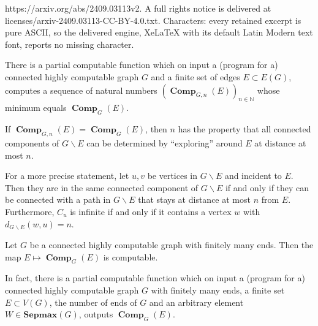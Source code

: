 \documentclass[10pt,a4paper]{amsart}
\newcommand{\N}{\mathbb{N}}
\newcommand{\comp}{\operatorname{\mathbf{Comp}}}
\newcommand{\sepmax}[1]{\mathbf{Sepmax}({#1})}
\begin{document}
https://arxiv.org/abs/2409.03113v2. A full rights notice is delivered at licenses/arxiv-2409.03113-CC-BY-4.0.txt. Characters: every retained excerpt is pure ASCII, so the delivered engine, XeLaTeX with its default Latin Modern text font, reports no missing character.
\begin{prop}
\label{prop:comp-is-upper-computable}
There is a partial computable function which on input a (program for a) connected highly computable graph $G$ and a finite set of edges $E\subset E(G)$, computes a  sequence of natural numbers $(\comp_{G,n}(E))_{n\in\N}$ whose minimum equals $\comp_{G}(E)$.
\end{prop}

\begin{rmk}\label{comp-function-extra-obs}
    If $\comp_{G,n}(E)=\comp_G(E)$, then $n$ has the property that all connected components of $G\smallsetminus E$ can be determined by ``exploring'' around $E$ at distance at most $n$. 
    
    For a more precise statement, let  $u,v$ be vertices in $G\smallsetminus E$  and incident to $E$. Then they are in the same connected component of $G\smallsetminus E$ if and only if they can be connected with a path in $G\smallsetminus E$ that stays at distance at most $n$ from $E$. 
    Furthermore, $C_u$ is infinite if and only if it contains a vertex $w$ with  $d_{G\smallsetminus E}(w,u)=n$. 
\end{rmk}

\begin{thm}\label{thm:magic_function}
    Let $G$ be a connected highly computable graph with finitely many ends. Then the map $E\mapsto \comp_G(E)$ is computable. 

    In fact, there is a partial computable function which on input a (program for a) connected highly computable graph $G$ with finitely many ends, a finite set $E \subset V(G)$, the number of ends of $G$ and an arbitrary element $W \in \sepmax{G}$, outputs $\comp_{G}(E)$. 
\end{thm}
\end{document}
